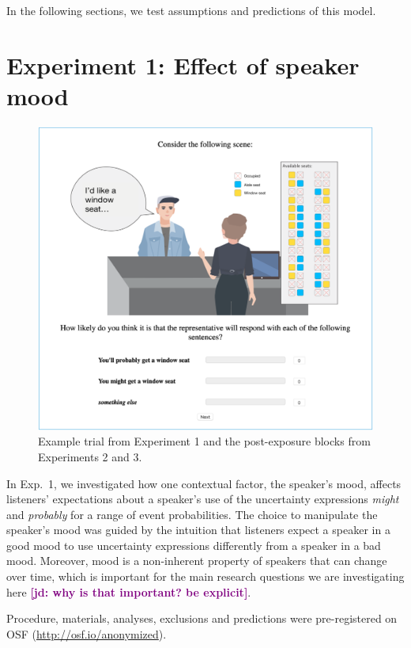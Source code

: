 \documentclass[man,floatsintext]{apa6}
\newcommand{\jd}[1]{\textcolor{Purple}{\bf [jd: #1]}}
\begin{document}
In the following sections, we test assumptions and predictions of this model. 



\section{Experiment 1: Effect of speaker mood}

\begin{figure}
    \centering
    \includegraphics[width=0.6\columnwidth, trim={0 1cm 0 0cm}]{example-trial.png}
    \caption{Example trial from Experiment 1 and the post-exposure blocks from Experiments 2 and 3.}
    \label{fig:example-trial}
\end{figure}

In Exp.~1, we investigated how one contextual factor, the speaker's mood, affects listeners' expectations about a speaker's use of the uncertainty expressions \textit{might} and \textit{probably} for a range of event probabilities. The choice to manipulate the speaker's mood was guided by the intuition that listeners expect a speaker in a good mood to use uncertainty expressions differently from a speaker in a bad mood. Moreover, mood is a non-inherent property of speakers that can change over time, which is important for the main research questions we are investigating here \jd{why is that important? be explicit}. 

Procedure, materials, analyses, exclusions and predictions were pre-registered on OSF (\url{http://osf.io/anonymized}).
\end{document}
